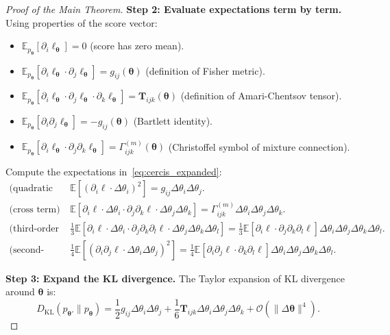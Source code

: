 \documentclass[12pt,a4paper]{article}
\theoremstyle{plain}
\theoremstyle{definition}
\theoremstyle{remark}
\newcommand{\E}{\mathbb{E}}
\newcommand{\DKL}{D_{\mathrm{KL}}}
\newcommand{\ACT}{\mathbf{T}}    %
\begin{document}
\begin{proof}[Proof of the Main Theorem]
\textbf{Step 2: Evaluate expectations term by term.}
Using properties of the score vector:
\begin{itemize}
    \item $\E_{p_{\bm{\theta}}}[\partial_i \ell_{\bm{\theta}}] = 0$ (score has zero mean).
    \item $\E_{p_{\bm{\theta}}}[\partial_i \ell_{\bm{\theta}} \cdot \partial_j \ell_{\bm{\theta}}] = g_{ij}(\bm{\theta})$ (definition of Fisher metric).
    \item $\E_{p_{\bm{\theta}}}[\partial_i \ell_{\bm{\theta}} \cdot \partial_j \ell_{\bm{\theta}} \cdot \partial_k \ell_{\bm{\theta}}] = \ACT_{ijk}(\bm{\theta})$ (definition of Amari-Chentsov tensor).
    \item $\E_{p_{\bm{\theta}}}[\partial_i \partial_j \ell_{\bm{\theta}}] = -g_{ij}(\bm{\theta})$ (Bartlett identity).
    \item $\E_{p_{\bm{\theta}}}[\partial_i \ell_{\bm{\theta}} \cdot \partial_j \partial_k \ell_{\bm{\theta}}] = \Gamma^{(m)}_{ijk}(\bm{\theta})$ (Christoffel symbol of mixture connection).
\end{itemize}

Compute the expectations in~\eqref{eq:cercis_expanded}:
\begin{align}
    \text{(quadratic term)} \quad &\E[(\partial_i \ell \cdot \Delta\theta_i)^2] = g_{ij} \Delta\theta_i \Delta\theta_j. \label{eq:term_quadratic}\\[4pt]
    \text{(cross term)} \quad &\E[\partial_i \ell \cdot \Delta\theta_i \cdot \partial_j \partial_k \ell \cdot \Delta\theta_j \Delta\theta_k]
        = \Gamma^{(m)}_{ijk} \Delta\theta_i \Delta\theta_j \Delta\theta_k. \label{eq:term_cross}\\[4pt]
    \text{(third-order score term)} \quad &\frac{1}{3} \E[\partial_i \ell \cdot \Delta\theta_i \cdot \partial_j \partial_k \partial_l \ell \cdot \Delta\theta_j \Delta\theta_k \Delta\theta_l]
        = \frac{1}{3} \E[\partial_i \ell \cdot \partial_j \partial_k \partial_l \ell] \Delta\theta_i \Delta\theta_j \Delta\theta_k \Delta\theta_l. \label{eq:term_third}\\[4pt]
    \text{(second-derivative squared term)} \quad &\frac{1}{4} \E[(\partial_i \partial_j \ell \cdot \Delta\theta_i \Delta\theta_j)^2]
        = \frac{1}{4} \E[\partial_i \partial_j \ell \cdot \partial_k \partial_l \ell] \Delta\theta_i \Delta\theta_j \Delta\theta_k \Delta\theta_l. \label{eq:term_second_sq}
\end{align}

\textbf{Step 3: Expand the KL divergence.}
The Taylor expansion of KL divergence around $\bm{\theta}$ is:
\begin{equation}\label{eq:kl_expanded}
    \DKL(p_{\bm{\theta}'} \| p_{\bm{\theta}})
    = \frac{1}{2} g_{ij} \Delta\theta_i \Delta\theta_j
      + \frac{1}{6} \ACT_{ijk} \Delta\theta_i \Delta\theta_j \Delta\theta_k
      + \mathcal{O}(\|\Delta\bm{\theta}\|^4).
\end{equation}


\end{proof}
\end{document}
